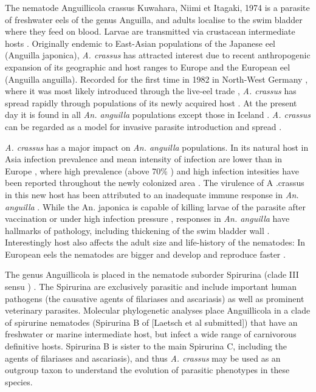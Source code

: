 \documentclass[10pt]{bmc_article}
\newenvironment{bmcformat}{\begin{raggedright}\baselineskip20pt\sloppy\setboolean{publ}{false}}{\end{raggedright}\baselineskip20pt\sloppy}
\begin{document}
\begin{bmcformat}
The nematode Anguillicola crassus Kuwahara, Niimi et Itagaki, 1974
\cite{kuwahara_Niimi_Itagaki_1974} is a parasite of freshwater eels of
the genus Anguilla, and adults localise to the swim bladder where they
feed on blood. Larvae are transmitted via crustacean intermediate
hosts \cite{de_charleroy_life_1990}. Originally endemic to East-Asian
populations of the Japanese eel (Anguilla japonica),
\textit{A. crassus} has attracted interest due to recent anthropogenic
expansion of its geographic and host ranges to Europe and the European
eel (Anguilla anguilla). Recorded for the first time in 1982 in
North-West Germany \cite{fischer_teichwirt}, where it was most likely
introduced through the live-eel trade
\cite{koops_anguillicola-infestations_1989, koie_swimbladder_1991},
\textit{A. crassus} has spread rapidly through populations of its
newly acquired host \cite{kirk_impact_2003}. At the present day it is
found in all \textit{An. anguilla} populations except those in Iceland
\cite{kristmundsson_parasite_2007}. \textit{A. crassus} can be
regarded as a model for invasive parasite introduction and spread
\cite{taraschewski_hosts_2007}.

\textit{A. crassus} has a major impact on \textit{An. anguilla} populations. In its
natural host in Asia infection prevalence and mean intensity of
infection are lower than in Europe \cite{mnderle_occurrence_2006},
where high prevalence (above 70\% \cite{wrtz_distribution_1998}) and
high infection intesities have been reported throughout the newly
colonized area \cite{lefebvre_anguillicolosis:_2004}. The virulence of
A .crassus in this new host has been attributed to an inadequate
immune response in \textit{An. anguilla} \cite{knopf_swimbladder_2006}. While
the An.  japonica is capable of killing larvae of the parasite after
vaccination \cite{knopf_vaccination_2008} or under high infection
pressure \cite{heitlinger_massive_2009}, responses in \textit{An. anguilla}
have hallmarks of pathology, including thickening of the swim bladder
wall \cite{wurtz_tara_2000}.  Interestingly host also
affects the adult size and life-history of the nematodes: In European
eels the nematodes are bigger and develop and reproduce faster
\cite{knopf_differences_2004}.

The genus Anguillicola is placed in the nematode suborder Spirurina
(clade III sensu \cite{blaxter_molecular_1998})
\cite{nadler_molecular_2007, wijov_evolutionary_2006}. The Spirurina
are exclusively parasitic and include important human pathogens (the
causative agents of filariases and ascariasis) as well as prominent
veterinary parasites. Molecular phylogenetic analyses place
Anguillicola in a clade of spirurine nematodes (Spirurina B of
[Laetsch et al submitted]) that have an freshwater or marine
intermediate host, but infect a wide range of carnivorous definitive
hosts. Spirurina B is sister to the main Spirurina C, including the
agents of filariases and ascariasis), and thus \textit{A. crassus} may
be used as an outgroup taxon to understand the evolution of parasitic
phenotypes in these species.


\end{bmcformat}
\end{document}
